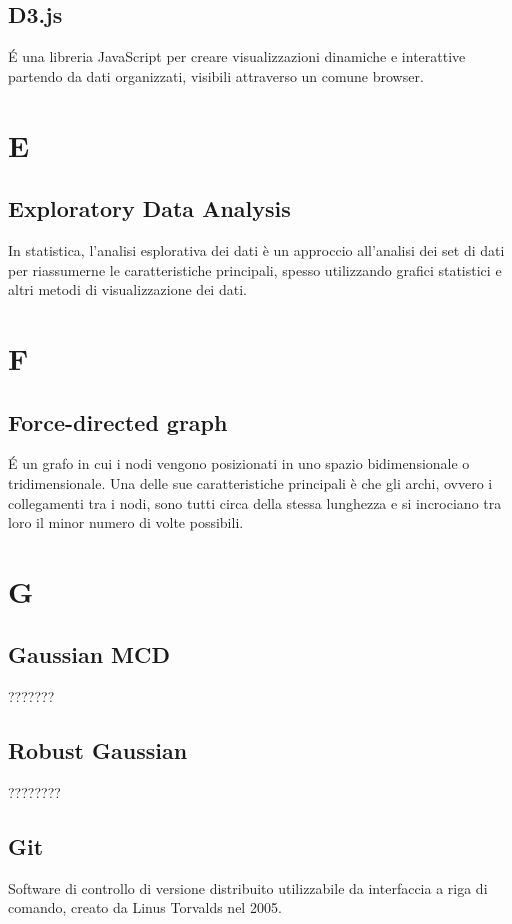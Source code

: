 \subsection{D3.js}
\'E una libreria JavaScript per creare visualizzazioni dinamiche e interattive partendo da dati organizzati, visibili attraverso un comune browser.

\section{E}
\subsection{Exploratory Data Analysis}
In statistica, l'analisi esplorativa dei dati è un approccio all'analisi dei set di dati per riassumerne le caratteristiche principali, spesso utilizzando grafici statistici e altri metodi di visualizzazione dei dati.

\section{F}
\subsection{Force-directed graph}
\'E un grafo in cui i nodi vengono posizionati in uno spazio bidimensionale o tridimensionale. Una delle sue caratteristiche principali è che gli archi, ovvero i collegamenti tra i nodi, sono tutti circa della stessa lunghezza e si incrociano tra loro il minor numero di volte possibili.

\section{G}
\subsection{Gaussian MCD}
???????

\subsection{Robust Gaussian}
????????

\subsection{Git}
Software di controllo di versione distribuito utilizzabile da interfaccia a riga di comando, creato da Linus Torvalds nel 2005.

